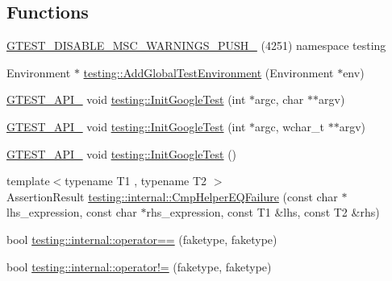 \subsection*{Functions}
\begin{DoxyCompactItemize}
\item 
\mbox{\hyperlink{_obj__test_2lib_2googletest-master_2googletest_2include_2gtest_2gtest_8h_a88f79832f9d045112a76e9da8611cc13}{G\+T\+E\+S\+T\+\_\+\+D\+I\+S\+A\+B\+L\+E\+\_\+\+M\+S\+C\+\_\+\+W\+A\+R\+N\+I\+N\+G\+S\+\_\+\+P\+U\+S\+H\+\_\+}} (4251) namespace testing
\item 
Environment $\ast$ \mbox{\hyperlink{namespacetesting_a224caeebdb6586b728d204367fea1087}{testing\+::\+Add\+Global\+Test\+Environment}} (Environment $\ast$env)
\item 
\mbox{\hyperlink{_obj__test_2lib_2googletest-release-1_88_81_2googletest_2include_2gtest_2internal_2gtest-port_8h_aa73be6f0ba4a7456180a94904ce17790}{G\+T\+E\+S\+T\+\_\+\+A\+P\+I\+\_\+}} void \mbox{\hyperlink{namespacetesting_afd726ae08c9bd16dc52f78c822d9946b}{testing\+::\+Init\+Google\+Test}} (int $\ast$argc, char $\ast$$\ast$argv)
\item 
\mbox{\hyperlink{_obj__test_2lib_2googletest-release-1_88_81_2googletest_2include_2gtest_2internal_2gtest-port_8h_aa73be6f0ba4a7456180a94904ce17790}{G\+T\+E\+S\+T\+\_\+\+A\+P\+I\+\_\+}} void \mbox{\hyperlink{namespacetesting_ae5a88709a4a7529e30c83242156556b3}{testing\+::\+Init\+Google\+Test}} (int $\ast$argc, wchar\+\_\+t $\ast$$\ast$argv)
\item 
\mbox{\hyperlink{_obj__test_2lib_2googletest-release-1_88_81_2googletest_2include_2gtest_2internal_2gtest-port_8h_aa73be6f0ba4a7456180a94904ce17790}{G\+T\+E\+S\+T\+\_\+\+A\+P\+I\+\_\+}} void \mbox{\hyperlink{namespacetesting_ace27eb9a2534996f3711aa719689f987}{testing\+::\+Init\+Google\+Test}} ()
\item 
{\footnotesize template$<$typename T1 , typename T2 $>$ }\\Assertion\+Result \mbox{\hyperlink{namespacetesting_1_1internal_a1def8ec9393360a1b34a20528703e7f7}{testing\+::internal\+::\+Cmp\+Helper\+E\+Q\+Failure}} (const char $\ast$lhs\+\_\+expression, const char $\ast$rhs\+\_\+expression, const T1 \&lhs, const T2 \&rhs)
\item 
bool \mbox{\hyperlink{namespacetesting_1_1internal_a5e3e473798de3189e9343132bcfd4fea}{testing\+::internal\+::operator==}} (faketype, faketype)
\item 
bool \mbox{\hyperlink{namespacetesting_1_1internal_afa44fdec84edfc155ef63e4f0d4287cc}{testing\+::internal\+::operator!=}} (faketype, faketype)

\end{DoxyCompactItemize}
